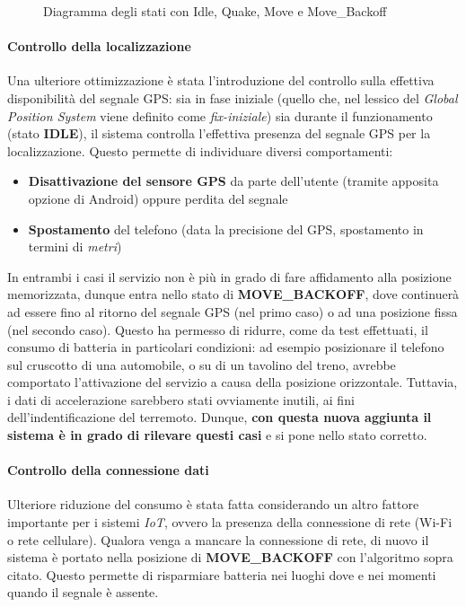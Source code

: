\documentclass[a4paper,10pt]{memoir}
\begin{document}
\begin{figure}[ht]
\centering
\label{fig:scs_sm2}
\caption{Diagramma degli stati con Idle, Quake, Move e Move\_Backoff}
\end{figure}

\paragraph{Controllo della localizzazione} Una ulteriore ottimizzazione è stata l'introduzione del controllo sulla effettiva disponibilità del segnale GPS: sia in fase iniziale (quello che, nel lessico del \textit{Global Position System} viene definito come \textit{fix-iniziale}) sia durante il funzionamento (stato \textbf{IDLE}), il sistema controlla l'effettiva presenza del segnale GPS per la localizzazione. Questo permette di individuare diversi comportamenti:

\begin{itemize}
\item \textbf{Disattivazione del sensore GPS} da parte dell'utente (tramite apposita opzione di Android) oppure perdita del segnale
\item \textbf{Spostamento} del telefono (data la precisione del GPS, spostamento in termini di \textit{metri})
\end{itemize}

In entrambi i casi il servizio non è più in grado di fare affidamento alla posizione memorizzata, dunque entra nello stato di \textbf{MOVE\_BACKOFF}, dove continuerà ad essere fino al ritorno del segnale GPS (nel primo caso) o ad una posizione fissa (nel secondo caso). Questo ha permesso di ridurre, come da test effettuati, il consumo di batteria in particolari condizioni: ad esempio posizionare il telefono sul cruscotto di una automobile, o su di un tavolino del treno, avrebbe comportato l'attivazione del servizio a causa della posizione orizzontale. Tuttavia, i dati di accelerazione sarebbero stati ovviamente inutili, ai fini dell'indentificazione del terremoto. Dunque, \textbf{con questa nuova aggiunta il sistema è in grado di rilevare questi casi} e si pone nello stato corretto.

\paragraph{Controllo della connessione dati} Ulteriore riduzione del consumo è stata fatta considerando un altro fattore importante per i sistemi \textit{IoT}, ovvero la presenza della connessione di rete (Wi-Fi o rete cellulare). Qualora venga a mancare la connessione di rete, di nuovo il sistema è portato nella posizione di \textbf{MOVE\_BACKOFF} con l'algoritmo sopra citato. Questo permette di risparmiare batteria nei luoghi dove e nei momenti quando il segnale è assente.
\end{document}
